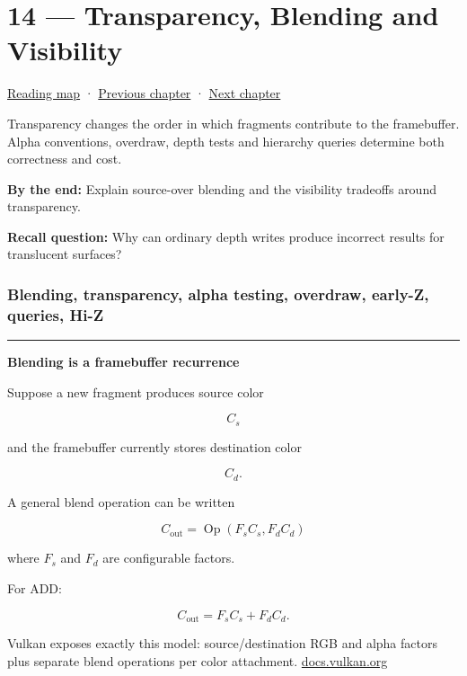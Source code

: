 \hypertarget{03-visual-computing-i-ch014}{}
\chapter{14 --- Transparency, Blending and Visibility}\label{03-visual-computing-i-ch014-transparency-blending-and-visibility}

\hyperref[volume-reading-map]{Reading map} · \hyperref[03-visual-computing-i-ch013]{Previous chapter} · \hyperref[03-visual-computing-i-ch015]{Next chapter}

Transparency changes the order in which fragments contribute to the framebuffer. Alpha conventions, overdraw, depth tests and hierarchy queries determine both correctness and cost.

\textbf{By the end:} Explain source-over blending and the visibility tradeoffs around transparency.

\textbf{Recall question:} Why can ordinary depth writes produce incorrect results for translucent surfaces?

\subsection{Blending, transparency, alpha testing, overdraw, early-Z, queries, Hi-Z}\label{03-visual-computing-i-ch014-blending-transparency-alpha-testing-overdraw-early-z-queries-hi-z}

\begin{center}\rule{0.5\linewidth}{0.5pt}\end{center}

\textbf{Blending is a framebuffer recurrence}

Suppose a new fragment produces source color

\[
C_s
\]

and the framebuffer currently stores destination color

\[
C_d.
\]

A general blend operation can be written

\[
\boxed{
C_{\text{out}}
=
\operatorname{Op}
\left(
F_s C_s,
F_d C_d
\right)
}
\]

where \(F_s\) and \(F_d\) are configurable factors.

For ADD:

\[
C_{\text{out}}
=
F_sC_s+F_dC_d.
\]

Vulkan exposes exactly this model: source/destination RGB and alpha factors plus separate blend operations per color attachment. \href{https://docs.vulkan.org/spec/latest/chapters/framebuffer.html?utm_source=chatgpt.com}{docs.vulkan.org}

